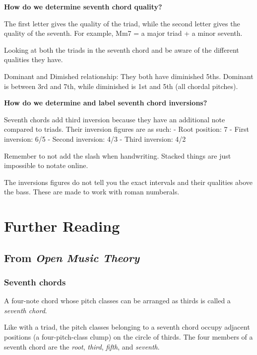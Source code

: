 \documentclass{book}
\begin{document}
\textbf{How do we determine seventh chord quality?}

The first letter gives the quality of the triad, while the second letter gives
the quality of the seventh. For example, Mm7 = a major triad + a minor
seventh.

Looking at both the triads in the seventh chord and be aware of the different
qualities they have.

Dominant and Dimished relationship: They both have diminished 5ths. Dominant
is between 3rd and 7th, while diminished is 1st and 5th (all chordal pitches).

\textbf{How do we determine and label seventh chord inversions?}

Seventh chords add third inversion because they have an additional note
compared to triads. Their inversion figures are as such: - Root position: 7 -
First inversion: 6/5 - Second inversion: 4/3 - Third inversion: 4/2

Remember to not add the slash when handwriting. Stacked things are just
impossible to notate online.

The inversions figures do not tell you the exact intervals and their qualities
above the bass. These are made to work with roman numberals.

\hypertarget{further-reading-15}{%
\chapter{Further Reading}\label{further-reading-15}}

\hypertarget{from-open-music-theory-15}{%
\section{\texorpdfstring{From \emph{Open Music
Theory}}{From Open Music Theory}}\label{from-open-music-theory-15}}

\hypertarget{seventh-chords}{%
\subsection{Seventh chords}\label{seventh-chords}}

A four-note chord whose pitch classes can be arranged as thirds is called a
\emph{seventh chord}.

Like with a triad, the pitch classes belonging to a seventh chord occupy
adjacent positions (a four-pitch-class clump) on the circle of thirds. The
four members of a seventh chord are the \emph{root}, \emph{third},
\emph{fifth}, and \emph{seventh}.
\end{document}
